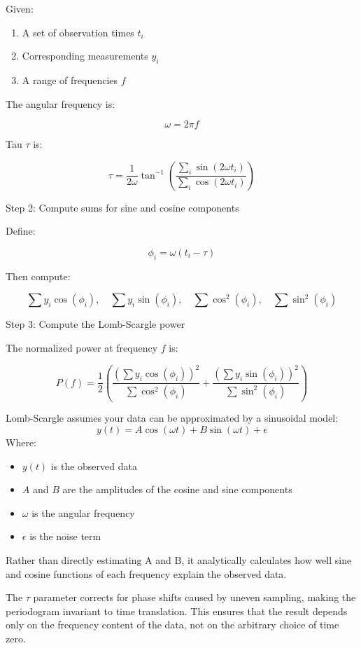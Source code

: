 Given:

\begin{enumerate}
    \item A set of observation times \(t_i\)
    \item Corresponding measurements \(y_i\)
    \item A range of frequencies \(f\)
\end{enumerate}

The angular frequency is:

$$
\omega = 2\pi f
$$

Tau \(\tau\) is:

$$
\tau = \frac{1}{2\omega} \tan^{-1} \left( \frac{\sum_i \sin(2\omega t_i)}{\sum_i \cos(2\omega t_i)} \right)
$$

Step 2: Compute sums for sine and cosine components

Define:

$$
\phi_i = \omega (t_i - \tau)
$$

Then compute:

$$
\sum y_i \cos(\phi_i), \quad \sum y_i \sin(\phi_i), \quad \sum \cos^2(\phi_i), \quad \sum \sin^2(\phi_i)
$$

Step 3: Compute the Lomb-Scargle power

The normalized power at frequency \(f\) is:

$$
P(f) = \frac{1}{2} \left( \frac{\left(\sum y_i \cos(\phi_i)\right)^2}{\sum \cos^2(\phi_i)} + \frac{\left(\sum y_i \sin(\phi_i)\right)^2}{\sum \sin^2(\phi_i)} \right)
$$

Lomb-Scargle assumes your data can be approximated by a sinusoidal model:
$$
y(t) = A \cos(\omega t ) + B \sin(\omega t) + \epsilon
$$
Where:
\begin{itemize}
    \item \(y(t)\) is the observed data
    \item \(A\) and \(B\) are the amplitudes of the cosine and sine components
    \item \(\omega\) is the angular frequency
    \item \(\epsilon\) is the noise term
\end{itemize}

Rather than directly estimating A and B, it analytically calculates how well sine and cosine functions of each frequency explain the observed data.

The $\tau$ parameter corrects for phase shifts caused by uneven sampling, making the periodogram invariant to time translation. This ensures that the result depends only on the frequency content of the data, not on the arbitrary choice of time zero.